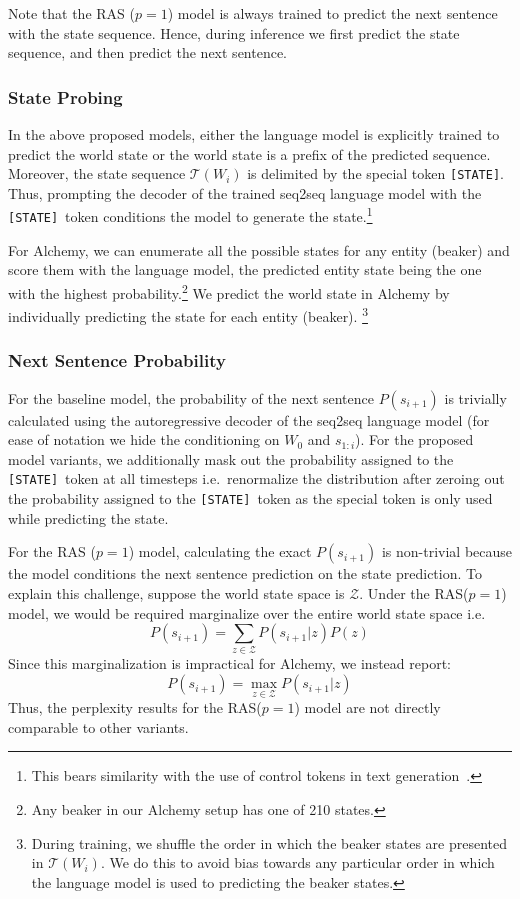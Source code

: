 \documentclass[12pt]{thesis-umich}[thesis]
\newcommand{\state}[0]{\texttt{[STATE]}}
\begin{document}
Note that the RAS ($p=1$) model is always trained to predict the next sentence with the state sequence. Hence, during inference we first predict the state sequence, and then predict the next sentence. 


\subsubsection{State Probing} In the above proposed models, either the language model is explicitly trained to predict the world state or the world state is a prefix of the predicted sequence. Moreover, the state sequence $\mathcal{T}(W_i)$ is delimited by the special token \state. Thus, prompting the decoder of the trained seq2seq language model  with the \state\ token conditions the model to generate the state.\footnote{This bears similarity with the use of control tokens in text generation~\cite{keskar2019ctrl, see-etal-2019-makes}.} 

For Alchemy, we can enumerate all the possible states for any entity (beaker) and score them with the language model, the predicted entity state being the one with the highest probability.\footnote{Any beaker in our Alchemy setup has one of 210 states.}    
We predict the world state in Alchemy by individually predicting the state for each entity (beaker). \footnote{During training, we 
shuffle the order in which the beaker states are presented in $\mathcal{T}(W_i)$. We do this to avoid bias towards any particular order in which the language model is used to predicting the beaker states.}


\subsubsection{Next Sentence Probability}
For the baseline model, the probability of the next sentence $P(s_{i+1})$ is trivially calculated using the autoregressive decoder of the seq2seq language model (for ease of notation we hide the conditioning on $W_0$ and $s_{1:i}$). For the proposed model variants, we additionally mask out the probability assigned to the \state\ token at all timesteps i.e.\ renormalize the distribution after zeroing out the probability assigned to the \state\ token
as the special token is only used while predicting the state. 

For the RAS ($p=1$) model, calculating the exact $P(s_{i+1})$ is non-trivial because the model conditions the next sentence prediction on the state prediction. 
To explain this challenge, suppose the world state space is $\mathcal{Z}$. 
Under the RAS($p=1$) model, we would be required marginalize over the entire world state space i.e.\ 
$$P(s_{i+1}) = \sum_{z \in \mathcal{Z}} P(s_{i+1} | z) P(z)$$
Since this marginalization is impractical for Alchemy, we instead report:
$$P(s_{i+1}) = \max_{z \in \mathcal{Z}} P(s_{i+1} | z)$$
Thus, the perplexity results for the RAS($p=1$) model are not directly comparable to other variants.
\end{document}
